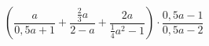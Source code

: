 \begin{ex}[type=expression]
	\begin{condition}
		\( \left( \dfrac{a}{0,5a+1} +\dfrac{\frac{2}{3}a}{2-a}+\dfrac{2a}{\frac{1}{4}a^2-1}\right)\cdot\dfrac{0,5a-1}{0,5a-2} \)
	\end{condition}
\end{ex}